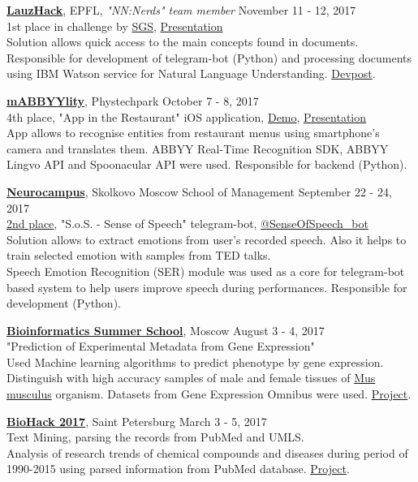 \documentclass[margin, 9pt]{res} %
\begin{document}
\begin{resume}
\textbf{\href{http://lauzhack.com}{LauzHack}}, EPFL, {\sl "NN:Nerds" team member} \hfill November 11 - 12, 2017 \\
1st place in challenge by \href{http://www.sgs.com}{SGS}, \href{https://akarazeev.github.io/data/Presentation_NNNerds.pdf}{Presentation}\\
Solution allows quick access to the main concepts found in documents. Responsible for development of telegram-bot (Python) and processing documents using IBM Watson service for Natural Language Understanding. \href{https://devpost.com/software/nn-nerds}{Devpost}.

\textbf{\href{https://mobility.abbyy.com/hack/}{mABBYYlity}}, Phystechpark  \hfill October 7 - 8, 2017 \\
4th place, "App in the Restaurant" iOS application, \href{https://youtu.be/YNgUMhhqIrs}{Demo}, \href{https://akarazeev.github.io/data/app_in_the_restaurant.pdf}{Presentation}\\
App allows to recognise entities from restaurant menus using smartphone's camera and translates them. ABBYY Real-Time Recognition SDK, ABBYY Lingvo API and Spoonacular API were used. Responsible for backend (Python).

\textbf{\href{http://neurocampus.webflow.io}{Neurocampus}}, Skolkovo Moscow School of Management  \hfill September 22 - 24, 2017 \\
\href{https://akarazeev.github.io/data/telegram_diploma_sos.PDF}{2nd place}, "S.o.S. - Sense of Speech" telegram-bot, \href{https://t.me/senseofspeech_bot}{@SenseOfSpeech\_bot}\\
Solution allows to extract emotions from user's recorded speech. Also it helps to train selected emotion with samples from TED talks.\\
Speech Emotion Recognition (SER) module was used as a core for telegram-bot based system to help users improve speech during performances. Responsible for development (Python).

\textbf{\href{http://bioinformaticsinstitute.ru/summer2017}{Bioinformatics Summer School}}, Moscow  \hfill August 3 - 4, 2017 \\
"Prediction of Experimental Metadata from Gene Expression" \\
Used Machine learning algorithms to predict phenotype by gene expression. \\
Distinguish with high accuracy samples of male and female tissues of \href{https://www.ncbi.nlm.nih.gov/Taxonomy/Browser/wwwtax.cgi?id=10090}{Mus musculus} organism. Datasets from Gene Expression Omnibus were used. \href{https://github.com/BioinfoGroup/MetaDataPredictionFromGE}{Project}.

\textbf{\href{http://biohack.ru}{BioHack 2017}}, Saint Petersburg \hfill March 3 - 5, 2017 \\
Text Mining, parsing the records from PubMed and UMLS.\\ Analysis of research trends of chemical compounds and diseases during period of 1990-2015 using parsed information from PubMed database. \href{https://github.com/akarazeev/BioHack2017}{Project}.


\end{resume}
\end{document}
